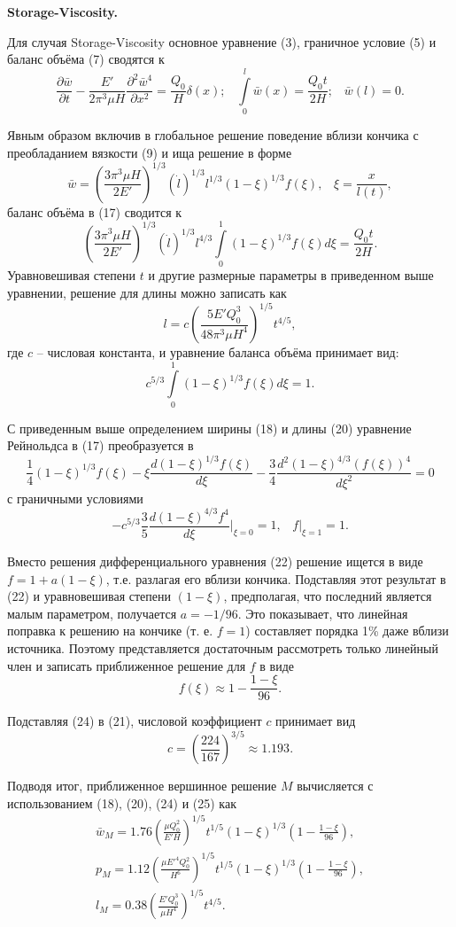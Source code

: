 \documentclass[a4paper, 12pt]{article}
\newcommand{\beq}{\begin{equation}}
\newcommand{\eeq}{\end{equation}}
\begin{document}
\textbf{Storage-Viscosity.}

Для случая Storage-Viscosity основное уравнение (3), граничное условие (5) и баланс объёма (7) сводятся к
\beq
\frac{\partial\bar{w}}{\partial t}-\frac{E'}{2\pi^3\mu H}\frac{\partial^2\bar{w}^4}{\partial x^2}=\frac{Q_0}{H}\delta(x);\,\,\,\,\,
\int\limits_{0}^{l}\bar{w}(x)=\frac{Q_0t}{2H};\,\,\,\,\,
\bar{w}(l)=0.
\eeq

Явным образом включив в глобальное решение поведение вблизи кончика с преобладанием вязкости (9) и ища решение в форме
\beq
\bar{w}=\left(\frac{3\pi^3\mu H}{2E'}\right)^{1/3}\left(\dot{l}\right)^{1/3}l^{1/3}\left(1-\xi\right)^{1/3}f(\xi),\,\,\,\,\,
\xi=\frac{x}{l(t)},
\eeq
баланс объёма в (17) сводится к
\beq
\left(\frac{3\pi^3\mu H}{2E'}\right)^{1/3}\left(\dot{l}\right)^{1/3}l^{4/3}\int\limits_{0}^{1}\left(1-\xi\right)^{1/3}f(\xi)d\xi=\frac{Q_0t}{2H}.
\eeq
Уравновешивая степени $t$ и другие размерные параметры в приведенном выше уравнении, решение для длины можно записать как
\beq
l=c\left(\frac{5E'Q_0^3}{48\pi^3\mu H^4}\right)^{1/5}t^{4/5},
\eeq
где $c$ -- числовая константа, и уравнение баланса объёма принимает вид:
\beq
c^{5/3}\int\limits_{0}^{1}\left(1-\xi\right)^{1/3}f(\xi)d\xi=1.
\eeq

С приведенным выше определением ширины (18) и длины (20) уравнение Рейнольдса в (17) преобразуется в
\beq
\frac{1}{4}\left(1-\xi\right)^{1/3}f(\xi)-\xi\frac{d(1-\xi)^{1/3}f(\xi)}{d\xi}-\frac{3}{4}\frac{d^2(1-\xi)^{4/3}(f(\xi))^4}{d\xi^2}=0
\eeq
с граничными условиями
\beq
-c^{5/3}\frac{3}{5}\frac{d(1-\xi)^{4/3}f^4}{d\xi}\bigg|_{\xi=0}=1,\,\,\,\,\,
f|_{\xi=1}=1.
\eeq

Вместо решения дифференциального уравнения (22) решение ищется в виде $f=1+a\left(1-\xi\right)$, т.е. разлагая его вблизи кончика.
Подставляя этот результат в (22) и уравновешивая степени $\left(1-\xi\right)$, предполагая, что последний является малым параметром, получается $a=-1/96$.
Это показывает, что линейная поправка к решению на кончике (т. е. $f=1$) составляет порядка 1\% даже вблизи источника.
Поэтому представляется достаточным рассмотреть только линейный член и записать приближенное решение для $f$ в виде
\beq
f(\xi)\approx1-\frac{1-\xi}{96}.
\eeq

Подставляя (24) в (21), числовой коэффициент $c$ принимает вид
\beq
c=\left(\frac{224}{167}\right)^{3/5}\approx1.193.
\eeq

Подводя итог, приближенное вершинное решение $M$ вычисляется с использованием (18), (20), (24) и (25) как
\beq
\begin{gathered}
\bar{w}_M=1.76\left(\frac{\mu Q_0^2}{E'H}\right)^{1/5}t^{1/5}(1-\xi)^{1/3}\left(1-\frac{1-\xi}{96}\right),\\
p_M=1.12\left(\frac{\mu E'^4Q_0^2}{H^6}\right)^{1/5}t^{1/5}(1-\xi)^{1/3}\left(1-\frac{1-\xi}{96}\right),\\
l_M=0.38\left(\frac{E'Q_0^3}{\mu H^4}\right)^{1/5}t^{4/5}.
\end{gathered}
\eeq
\end{document}
